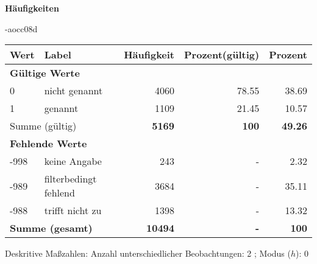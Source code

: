         		\vspace*{0.5cm}
                \noindent\textbf{Häufigkeiten}

                \vspace*{-\baselineskip}
					\begin{filecontents}{\jobname-aocc08d}
					\begin{longtable}{lXrrr}
					\toprule
					\textbf{Wert} & \textbf{Label} & \textbf{Häufigkeit} & \textbf{Prozent(gültig)} & \textbf{Prozent} \\
					\endhead
					\midrule
					\multicolumn{5}{l}{\textbf{Gültige Werte}}\\

					0 &
					\multicolumn{1}{X}{ nicht genannt   } &


					  \num{4060} &
					  \num[round-mode=places,round-precision=2]{78,55} &
					    \num[round-mode=places,round-precision=2]{38,69} \\

					1 &
					\multicolumn{1}{X}{ genannt   } &


					  \num{1109} &
					  \num[round-mode=places,round-precision=2]{21,45} &
					    \num[round-mode=places,round-precision=2]{10,57} \\
					\midrule
					\multicolumn{2}{l}{Summe (gültig)} &
					  \textbf{\num{5169}} &
					\textbf{100} &
					  \textbf{\num[round-mode=places,round-precision=2]{49,26}} \\
					\multicolumn{5}{l}{\textbf{Fehlende Werte}}\\
							-998 &
							keine Angabe &
							  \num{243} &
							 - &
							  \num[round-mode=places,round-precision=2]{2,32} \\
							-989 &
							filterbedingt fehlend &
							  \num{3684} &
							 - &
							  \num[round-mode=places,round-precision=2]{35,11} \\
							-988 &
							trifft nicht zu &
							  \num{1398} &
							 - &
							  \num[round-mode=places,round-precision=2]{13,32} \\
					\midrule
					\multicolumn{2}{l}{\textbf{Summe (gesamt)}} &
				      \textbf{\num{10494}} &
				    \textbf{-} &
				    \textbf{100} \\
					\bottomrule
					\end{longtable}
					\end{filecontents}
				\label{tableValues:aocc08d}
				\vspace*{-\baselineskip}
                    \begin{noten}
                	    \note{} Deskritive Maßzahlen:
                	    Anzahl unterschiedlicher Beobachtungen: 2%
                	    ; 
                	      Modus ($h$): 0
                     \end{noten}


